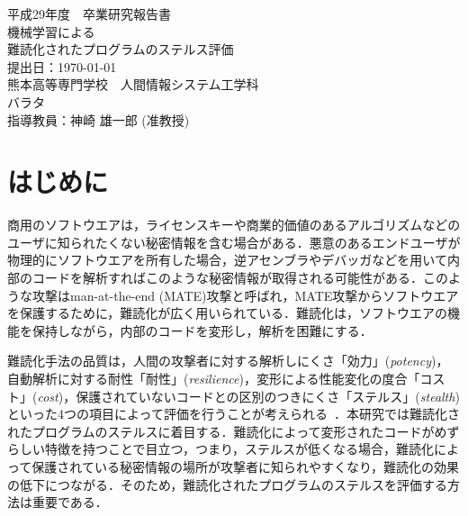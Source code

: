 \documentclass[12pt]{jarticle}
\begin{document}
\thispagestyle{empty}
\begin{center}
\vspace*{1zw}
{\Large 平成29年度　卒業研究報告書} \\
\vspace*{7zw}
{\LARGE 機械学習による} \\
\vspace*{0.5zw}
{\LARGE 難読化されたプログラムのステルス評価} \\
\vspace*{20zw}
{\large 提出日：\today} \\
\vspace*{5zw}
{\large 熊本高等専門学校　人間情報システム工学科} \\
\vspace*{2zw}
{\LARGE バラタ} \\
\vspace*{6zw}
{\large 指導教員：神崎 雄一郎 (准教授)}
\end{center}


\tableofcontents %

\newpage

\section{はじめに}  \label{sec:introduction}
商用のソフトウエアは，ライセンスキーや商業的価値のあるアルゴリズムなどのユーザに知られたくない秘密情報を含む場合がある．悪意のあるエンドユーザが物理的にソフトウエアを所有した場合，逆アセンブラやデバッガなどを用いて内部のコードを解析すればこのような秘密情報が取得される可能性がある．このような攻撃はman-at-the-end (MATE)攻撃と呼ばれ，MATE攻撃からソフトウエアを保護するために，難読化が広く用いられている．難読化は，ソフトウエアの機能を保持しながら，内部のコードを変形し，解析を困難にする．

難読化手法の品質は，人間の攻撃者に対する解析しにくさ「効力」(\textit{potency})，自動解析に対する耐性「耐性」(\textit{resilience})，変形による性能変化の度合「コスト」(\textit{cost})，保護されていないコードとの区別のつきにくさ「ステルス」(\textit{stealth})といった4つの項目によって評価を行うことが考えられる~\cite{resilience-banescu}．本研究では難読化されたプログラムのステルスに着目する．難読化によって変形されたコードがめずらしい特徴を持つことで目立つ，つまり，ステルスが低くなる場合，難読化によって保護されている秘密情報の場所が攻撃者に知られやすくなり，難読化の効果の低下につながる．そのため，難読化されたプログラムのステルスを評価する方法は重要である．
\end{document}
